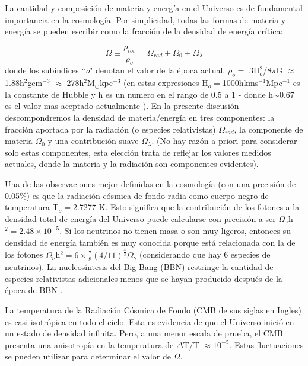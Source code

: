 La cantidad y composición de materia y energía en el Universo es de fundamental importancia en la cosmología. Por simplicidad, todas las formas de materia y energía se pueden escribir como la fracción de la densidad de energía crítica:

\begin{equation*}
    \Omega \equiv \frac{\rho_{tot}}{\rho_o} = \Omega_{rad} + \Omega_0 + \Omega_\lambda
    \label{eq:fracDensEnerCrit}
\end{equation*}
donde los subíndices ``\textit{o}" denotan el valor de la época actual, $\rho_o =$ 3H$^2_o$/$8\pi$G $\approx$ 1.88h$^2$gcm$^{-3}$ $\approx$ 278h$^2$M$_\odot$kpc$^{-3}$ (en estas expresiones H$_o=$1000hkms$^{-1}$Mpc$^{-1}$ es la constante de Hubble y h es un numero en el rango de 0.5 a 1 - donde h$\sim$0.67 es el valor mas aceptado actualmente \cite{2013PASA...30...52C}). En la presente discusión descompondremos la densidad de materia/energía en tres componentes: la fracción aportada por la radiación (o especies relativistas) $\Omega_{rad}$, la componente de materia $ \Omega_{0} $ y una contribución suave $\Omega_\lambda$. (No hay razón a priori para considerar solo estas componentes, esta elección trata de reflejar los valores medidos actuales, donde la materia y la radiación son componentes evidentes).

Una de las observaciones mejor definidas en la cosmología (con una precisión de 0.05$\%$) es que la radiación cósmica de fondo radia como cuerpo negro de temperatura T$_o=$2.7277 K. Esto significa que la contribución de los fotones a la densidad total de energía del Universo puede calcularse con precisión a ser $\Omega_\gamma$h$^2= 2.48\times 10^{-5}$. Si los neutrinos no tienen masa o son muy ligeros, entonces su densidad de energía también es muy conocida porque está relacionada con la de los fotones $\Omega_\nu$h$^2= 6\times \frac{7}{8}(4/11)^{\frac{4}{3}} \Omega_\gamma$ (considerando que hay 6 especies de neutrinos). La nucleosíntesis del Big Bang (BBN) restringe la cantidad de especies relativistas adicionales  menos que se hayan producido después de la época de BBN \cite{1999PhRvL..82.4176B}.


La temperatura de la Radiación Cósmica de Fondo (CMB de sus siglas en Ingles) es casi isotrópica en todo el cielo. Esta es evidencia de que el Universo inició en un estado de densidad infinita. Pero, a una menor escala de prueba, el CMB presenta una anisotropía en la temperatura de $\Delta$T/T $\approx 10^{-5}$. Estas fluctuaciones se pueden utilizar para determinar el valor de $\Omega$.

